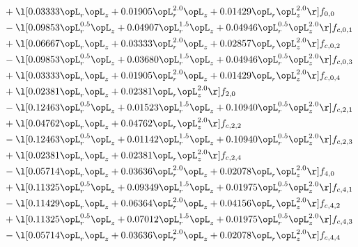 \begin{alignat}{2}
& + \l[  0.03333 \opL_r \opL_z +  0.01905 \opL_r^{2.0} \opL_z +  0.01429 \opL_r \opL_z^{2.0}  \r] f_{0,0} \nonumber \\ 
& - \l[  0.09853 \opL_r^{0.5} \opL_z +  0.04907 \opL_r^{1.5} \opL_z +  0.04946 \opL_r^{0.5} \opL_z^{2.0}  \r] f_{c,0,1} \nonumber \\ 
& + \l[  0.06667 \opL_r \opL_z +  0.03333 \opL_r^{2.0} \opL_z +  0.02857 \opL_r \opL_z^{2.0}  \r] f_{c,0,2} \nonumber \\ 
& - \l[  0.09853 \opL_r^{0.5} \opL_z +  0.03680 \opL_r^{1.5} \opL_z +  0.04946 \opL_r^{0.5} \opL_z^{2.0}  \r] f_{c,0,3} \nonumber \\ 
& + \l[  0.03333 \opL_r \opL_z +  0.01905 \opL_r^{2.0} \opL_z +  0.01429 \opL_r \opL_z^{2.0}  \r] f_{c,0,4} \nonumber \\ 
& + \l[  0.02381 \opL_r \opL_z +  0.02381 \opL_r \opL_z^{2.0}  \r] f_{2,0} \nonumber \\ 
& - \l[  0.12463 \opL_r^{0.5} \opL_z +  0.01523 \opL_r^{1.5} \opL_z +  0.10940 \opL_r^{0.5} \opL_z^{2.0}  \r] f_{c,2,1} \nonumber \\ 
& + \l[  0.04762 \opL_r \opL_z +  0.04762 \opL_r \opL_z^{2.0}  \r] f_{c,2,2} \nonumber \\ 
& - \l[  0.12463 \opL_r^{0.5} \opL_z +  0.01142 \opL_r^{1.5} \opL_z +  0.10940 \opL_r^{0.5} \opL_z^{2.0}  \r] f_{c,2,3} \nonumber \\ 
& + \l[  0.02381 \opL_r \opL_z +  0.02381 \opL_r \opL_z^{2.0}  \r] f_{c,2,4} \nonumber \\ 
& - \l[  0.05714 \opL_r \opL_z +  0.03636 \opL_r^{2.0} \opL_z +  0.02078 \opL_r \opL_z^{2.0}  \r] f_{4,0} \nonumber \\ 
& + \l[  0.11325 \opL_r^{0.5} \opL_z +  0.09349 \opL_r^{1.5} \opL_z +  0.01975 \opL_r^{0.5} \opL_z^{2.0}  \r] f_{c,4,1} \nonumber \\ 
& - \l[  0.11429 \opL_r \opL_z +  0.06364 \opL_r^{2.0} \opL_z +  0.04156 \opL_r \opL_z^{2.0}  \r] f_{c,4,2} \nonumber \\ 
& + \l[  0.11325 \opL_r^{0.5} \opL_z +  0.07012 \opL_r^{1.5} \opL_z +  0.01975 \opL_r^{0.5} \opL_z^{2.0}  \r] f_{c,4,3} \nonumber \\ 
& - \l[  0.05714 \opL_r \opL_z +  0.03636 \opL_r^{2.0} \opL_z +  0.02078 \opL_r \opL_z^{2.0}  \r] f_{c,4,4} \nonumber \\ 
\end{alignat} 


